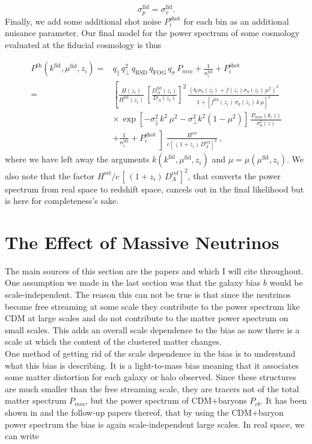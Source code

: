 \documentclass[../main.tex]{subfiles}
\begin{document}
\begin{equation}
    \sigma_p^\mathrm{fid} = \sigma_v^\mathrm{fid}.
\end{equation}
Finally, we add some additional shot noise $P^\mathrm{shot}_i$ for each bin as an additional nuisance parameter. Our final model for the power spectrum of some cosmology evaluated at the fiducial cosmology is thus

\begin{align}
    P^\mathrm{th}(k^\mathrm{fid},\mu^\mathrm{fid},z_i) =& q_\| \, q_\perp^2 \, q_\mathrm{RSD}\, q_\mathrm{FOG}\, q_\sigma\, P_{mm} + \frac{1}{n_i^\mathrm{fid}} + P_i^\mathrm{shot}\\
    =& \left[\frac{H(z_i)}{H^\mathrm{fid}(z_i)}\, \left[\frac{D^\mathrm{fid}_A(z_i)}{D_A(z_i)}\right]^2 \, \frac{\left(b_i \sigma_8(z_i) + f(z_i) \sigma_8(z_i) \,\mu^2 \right)^2}{1+\left[f^\mathrm{fid}(z_i)\,\sigma_p(z_i)\,k\,\mu\right]^2} \right. \nonumber\\
    &\times\,\exp\left[- \sigma_\|^2 \, k^2\,\mu^2 - \sigma_\perp^2 k^2 \left(1-\mu^2\right) \right]\, \frac{P_{mm}(k,z)}{\sigma_8^2(z)} \nonumber \\
    &+ \left.\frac{1}{n_i^\mathrm{fid}} + P_i^\mathrm{shot}\middle] \frac{H^\mathrm{ref}}{c\left[ \,(1+z_i)\,D_A^\mathrm{ref}\right]^2}\right.\:,\nonumber
\end{align}
where we have left away the arguments $k(k^\mathrm{fid},\mu^\mathrm{fid},z_i)$ and $\mu=\mu(\mu^\mathrm{fid},z_i)$. We also note that the factor $H^\mathrm{ref}/c\,\left[ \,(1+z_i)\,D_A^\mathrm{ref}\right]^2$, that converts the power spectrum from real space to redshift space, cancels out in the final likelihood but is here for completeness’s sake.

\section{The Effect of Massive Neutrinos}
The main sources of this section are the papers \cite{Raccanelli_2018} and \cite{Vagnozzi:2018pwo} which I will cite throughout. One assumption we made in the last section was that the galaxy bias $b$ would be scale-independent. The reason this can not be true is that since the neutrinos become free streaming at some scale they contribute to the power spectrum like CDM at large scales and do not contribute to the matter power spectrum on small scales. This adds an overall scale dependence to the bias as now there is a scale at which the content of the clustered matter changes.\\
One method of getting rid of the scale dependence in the bias is to understand what this bias is describing. It is a light-to-mass bias meaning that it associates some matter distortion for each galaxy or halo observed. Since these structures are much smaller than the free streaming scale, they are tracers not of the total matter spectrum $P_{mm}$, but the power spectrum of CDM+baryons $P_{cb}$. It has been shown in \cite{Villaescusa_Navarro_2014} and the follow-up papers thereof, that by using the CDM+baryon power spectrum the bias is again scale-independent large scales. In real space, we can write 
\end{document}
